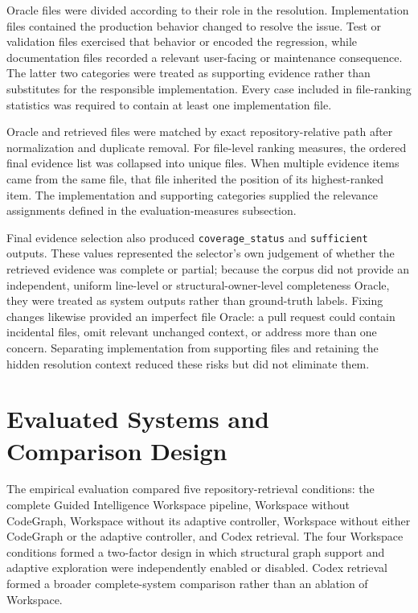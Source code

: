 Oracle files were divided according to their role in the resolution. Implementation files contained the production behavior changed to resolve the issue. Test or validation files exercised that behavior or encoded the regression, while documentation files recorded a relevant user-facing or maintenance consequence. The latter two categories were treated as supporting evidence rather than substitutes for the responsible implementation. Every case included in file-ranking statistics was required to contain at least one implementation file.

Oracle and retrieved files were matched by exact repository-relative path after normalization and duplicate removal. For file-level ranking measures, the ordered final evidence list was collapsed into unique files. When multiple evidence items came from the same file, that file inherited the position of its highest-ranked item. The implementation and supporting categories supplied the relevance assignments defined in the evaluation-measures subsection.

Final evidence selection also produced \texttt{coverage\_status} and \texttt{sufficient} outputs. These values represented the selector's own judgement of whether the retrieved evidence was complete or partial; because the corpus did not provide an independent, uniform line-level or structural-owner-level completeness Oracle, they were treated as system outputs rather than ground-truth labels. Fixing changes likewise provided an imperfect file Oracle: a pull request could contain incidental files, omit relevant unchanged context, or address more than one concern. Separating implementation from supporting files and retaining the hidden resolution context reduced these risks but did not eliminate them.

\section{Evaluated Systems and Comparison Design}\label{sec:evaluated-systems-and-comparison-design}

The empirical evaluation compared five repository-retrieval conditions: the complete Guided Intelligence Workspace pipeline, Workspace without CodeGraph, Workspace without its adaptive controller, Workspace without either CodeGraph or the adaptive controller, and Codex retrieval. The four Workspace conditions formed a two-factor design in which structural graph support and adaptive exploration were independently enabled or disabled. Codex retrieval formed a broader complete-system comparison rather than an ablation of Workspace.

